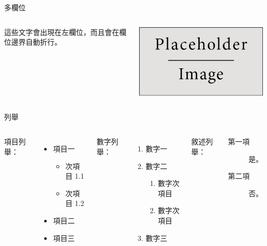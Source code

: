 \documentclass[hyperref={bookmarks=false}]{beamer}
\begin{document}
\begin{frame}{\iyan 多欄位}
  \begin{columns}
      這些文字會出現在左欄位，而且會在欄位邊界自動折行。

      \includegraphics[width=\linewidth]{Images/placeholder.jpg}
  \end{columns}
\end{frame}


\begin{frame}{\iyan 列舉}
  \begin{columns}[T, onlytextwidth] %
      項目列舉：
      \begin{itemize}
        \item 項目一
        \begin{itemize}
          \item 次項目 1.1
          \item 次項目 1.2
        \end{itemize}
        \item 項目二
        \item 項目三
      \end{itemize}

      數字列舉：
      \begin{enumerate}
        \item 數字一
        \item 數字二
        \begin{enumerate}
          \item 數字次項目
          \item 數字次項目
        \end{enumerate}
        \item 數字三
      \end{enumerate}

      敘述列舉：
      \begin{description}
        \item[第一項] 是。
        \item[第二項] 否。
      \end{description}
  \end{columns}
\end{frame}
\end{document}
